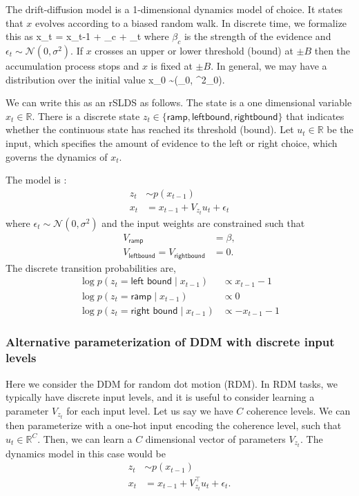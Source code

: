 \documentclass{article}
\begin{document}
The drift-diffusion model is a 1-dimensional dynamics model of choice. It states that $x$ evolves according to a biased random walk. In discrete time, we formalize this as 
\be
x_t = x_{t-1} + \beta_c + \epsilon_t
\ee
where $\beta_c$ is the strength of the evidence and $\epsilon_t \sim \mathcal{N}(0,\sigma^2)$. If $x$ crosses an upper or lower threshold (bound) at $\pm B$ then the accumulation process stops and $x$ is fixed at $\pm B$. In general, we may have a distribution over the initial value
\be
x_0 \sim {}(\mu_0, \sigma^2_0). 
\ee


We can write this as an rSLDS as follows. The state is a one dimensional variable $x_t \in \mathbb{R}$. There is a discrete state $z_t \in \{\mathsf{ramp}, \mathsf{left bound}, \mathsf{right bound}\}$ that indicates whether the continuous state has reached its threshold (bound). Let $u_t \in \mathbb{R}$ be the input, which specifies the amount of evidence to the left or right choice, which governs the dynamics of $x_t$. 

The model is :
\begin{align*}
z_t &\sim p(x_{t-1}) \\
x_t &= x_{t-1} + V_{z_t} u_t + \epsilon_t 
\end{align*}
where $\epsilon_t \sim \mathcal{N}(0, \sigma^2)$ and the input weights are constrained such that
\begin{align*}
V_{\mathsf{ramp}} &= \beta, \\
V_{\mathsf{left bound}} = V_{\mathsf{right bound}} &= 0.
\end{align*}
The discrete transition probabilities are,
\begin{align*}
\log p(z_t = \textsf{left bound} \mid x_{t-1}) &\propto x_{t-1} - 1 \\
\log p(z_t = \textsf{ramp} \mid x_{t-1}) &\propto 0 \\
\log p(z_t = \textsf{right bound} \mid x_{t-1}) &\propto -x_{t-1} - 1
\end{align*}

\subsubsection{Alternative parameterization of DDM with discrete input levels}
Here we consider the DDM for random dot motion (RDM). In RDM tasks, we typically have discrete input levels, and it is useful to consider learning a parameter $V_{z_t}$ for each input level. Let us say we have $C$ coherence levels. We can then parameterize with a one-hot input encoding the coherence level, such that $u_t \in \mathbb{R}^C$. Then, we can learn a $C$ dimensional vector of parameters $V_{z_t}$. The dynamics model in this case would be
\begin{align*}
z_t &\sim p(x_{t-1}) \\
x_t &= x_{t-1} + V_{z_t}^\top u_t + \epsilon_t.
\end{align*}
\end{document}
